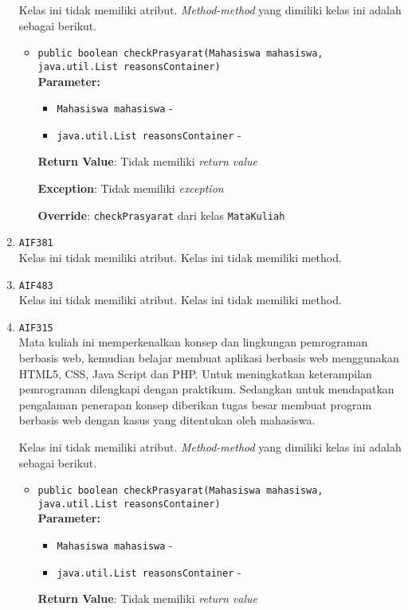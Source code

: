 \documentclass{article}
\begin{document}
\begin{enumerate}
Kelas ini tidak memiliki atribut. \textit{Method-method} yang dimiliki kelas ini adalah sebagai berikut.
\begin{itemize}
\item \texttt{public boolean checkPrasyarat(Mahasiswa mahasiswa, java.util.List reasonsContainer)}\\ 


\textbf{Parameter:}\begin{itemize}
\item \texttt{Mahasiswa mahasiswa} - 
\item \texttt{java.util.List reasonsContainer} - 
\end{itemize}
\textbf{Return Value}: Tidak memiliki \textit{return value}

\textbf{Exception}: Tidak memiliki \textit{exception}

\textbf{Override}: \texttt{checkPrasyarat} dari kelas \texttt{MataKuliah}

\end{itemize}
\item \texttt{AIF381}\\ 


Kelas ini tidak memiliki atribut. Kelas ini tidak memiliki method. \item \texttt{AIF483}\\ 


Kelas ini tidak memiliki atribut. Kelas ini tidak memiliki method. \item \texttt{AIF315}\\ 
Mata kuliah ini memperkenalkan konsep dan lingkungan pemrograman berbasis web,
 kemudian belajar membuat aplikasi berbasis web menggunakan HTML5, CSS, Java Script 
 dan PHP. Untuk meningkatkan keterampilan pemrograman dilengkapi dengan praktikum. 
 Sedangkan untuk mendapatkan pengalaman penerapan konsep diberikan tugas besar membuat 
 program berbasis web dengan kasus yang ditentukan oleh mahasiswa.

Kelas ini tidak memiliki atribut. \textit{Method-method} yang dimiliki kelas ini adalah sebagai berikut.
\begin{itemize}
\item \texttt{public boolean checkPrasyarat(Mahasiswa mahasiswa, java.util.List reasonsContainer)}\\ 


\textbf{Parameter:}\begin{itemize}
\item \texttt{Mahasiswa mahasiswa} - 
\item \texttt{java.util.List reasonsContainer} - 
\end{itemize}
\textbf{Return Value}: Tidak memiliki \textit{return value}


\end{itemize}
\end{enumerate}
\end{document}
